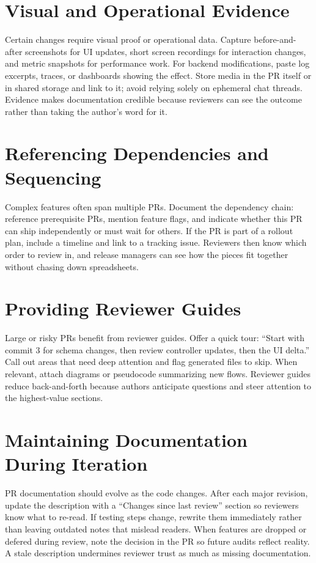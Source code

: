 \section{Visual and Operational Evidence}
Certain changes require visual proof or operational data. Capture before-and-after screenshots for UI updates, short screen recordings for interaction changes, and metric snapshots for performance work. For backend modifications, paste log excerpts, traces, or dashboards showing the effect. Store media in the PR itself or in shared storage and link to it; avoid relying solely on ephemeral chat threads. Evidence makes documentation credible because reviewers can see the outcome rather than taking the author's word for it.

\section{Referencing Dependencies and Sequencing}
Complex features often span multiple PRs. Document the dependency chain: reference prerequisite PRs, mention feature flags, and indicate whether this PR can ship independently or must wait for others. If the PR is part of a rollout plan, include a timeline and link to a tracking issue. Reviewers then know which order to review in, and release managers can see how the pieces fit together without chasing down spreadsheets.

\section{Providing Reviewer Guides}
Large or risky PRs benefit from reviewer guides. Offer a quick tour: ``Start with commit 3 for schema changes, then review controller updates, then the UI delta.'' Call out areas that need deep attention and flag generated files to skip. When relevant, attach diagrams or pseudocode summarizing new flows. Reviewer guides reduce back-and-forth because authors anticipate questions and steer attention to the highest-value sections.

\section{Maintaining Documentation During Iteration}
PR documentation should evolve as the code changes. After each major revision, update the description with a ``Changes since last review'' section so reviewers know what to re-read. If testing steps change, rewrite them immediately rather than leaving outdated notes that mislead readers. When features are dropped or defered during review, note the decision in the PR so future audits reflect reality. A stale description undermines reviewer trust as much as missing documentation.

